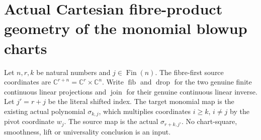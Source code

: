 \section{Actual Cartesian fibre-product geometry of the monomial blowup charts}
Let $n,r,k$ be natural numbers and $j\in\operatorname{Fin}(n)$. The fibre-first source coordinates are $\mathbb C^{r+n}=\mathbb C^r\times\mathbb C^n$. Write $\operatorname{fib}$ and $\operatorname{drop}$ for the two genuine finite continuous linear projections and $\operatorname{join}$ for their genuine continuous linear inverse. Let $j'=r+j$ be the literal shifted index. The target monomial map is the existing actual polynomial $\sigma_{k,j}$, which multiplies coordinates $i\geq k$, $i\neq j$ by the pivot coordinate $w_j$. The source map is the actual $\sigma_{r+k,j'}$. No chart-square, smoothness, lift or universality conclusion is an input.

